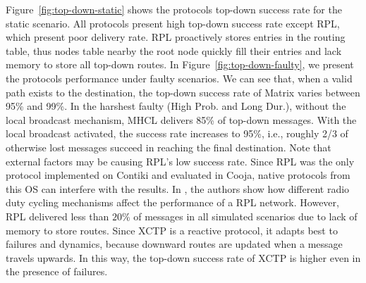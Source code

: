 Figure~\ref{fig:top-down-static} shows the protocols top-down success rate for the static scenario. All protocols present high top-down success rate except RPL, which present poor delivery rate. RPL proactively stores entries in the routing table, thus nodes table nearby the root node quickly fill their entries and lack memory to store all top-down routes. In Figure~\ref{fig:top-down-faulty}, we present the protocols performance under faulty scenarios. We can see that, when a valid path exists to the destination, the top-down success rate of Matrix varies between 95\% and 99\%. In the harshest faulty (High Prob. and Long Dur.), without the local broadcast mechanism, MHCL delivers 85\% of top-down messages. With the local broadcast activated, the success rate increases to 95\%, i.e., roughly 2/3 of otherwise lost messages succeed in reaching the final destination. Note that external factors may be causing RPL's low success rate. Since RPL was the only protocol implemented on Contiki and evaluated in Cooja, native protocols from this OS can interfere with the results. In \cite{Bezunartea:2016}, the authors show how different radio duty cycling mechanisms affect the performance of a RPL network. However, RPL delivered less than $20\%$ of messages in all simulated scenarios due to lack of memory to store routes.  Since XCTP is a reactive protocol, it adapts best to failures and dynamics, because downward routes are updated when a message travels upwards. In this way, the top-down success rate of XCTP is higher even in the presence of failures.

